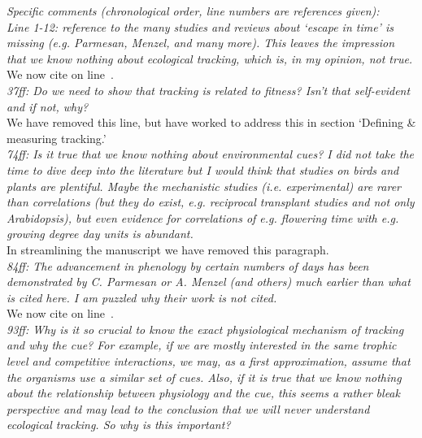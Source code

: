 \documentclass[11pt]{article}
\newcommand{\lr}[1]{line~\lineref{#1}}
\begin{document}
\emph{Specific comments (chronological order, line numbers are references given):\\
Line 1-12: reference to the many studies and reviews about ‘escape in time’ is missing (e.g.
Parmesan, Menzel, and many more). This leaves the impression that we know nothing about
ecological tracking, which is, in my opinion, not true.}\\

We now cite \citet{Menzel:2006xn,Parmesan:2006cr} on \lr{r1ass}.\\

\emph{37ff: Do we need to show that tracking is related to fitness? Isn’t that self-evident and if
not, why?}\\

We have removed this line, but have worked to address this in section `Defining \& measuring tracking.'\\

\emph{74ff: Is it true that we know nothing about environmental cues? I did not take the time to
dive deep into the literature but I would think that studies on birds and plants are
plentiful. Maybe the mechanistic studies (i.e. experimental) are rarer than correlations (but
they do exist, e.g. reciprocal transplant studies and not only Arabidopsis), but even
evidence for correlations of e.g. flowering time with e.g. growing degree day units is
abundant.}\\

In streamlining the manuscript we have removed this paragraph. \\ 

\emph{84ff: The advancement in phenology by certain numbers of days has been demonstrated by C.
Parmesan or A. Menzel (and others) much earlier than what is cited here. I am puzzled why
their work is not cited.}\\

We now cite \citet{Menzel:2006xn,Parmesan:2006cr} on \lr{r1ass1}.\\

\emph{93ff: Why is it so crucial to know the exact physiological mechanism of tracking and why the
cue? For example, if we are mostly interested in the same trophic level and competitive
interactions, we may, as a first approximation, assume that the organisms use a similar set
of cues. Also, if it is true that we know nothing about the relationship between physiology
and the cue, this seems a rather bleak perspective and may lead to the conclusion that we
will never understand ecological tracking. So why is this important?}\\
\end{document}
